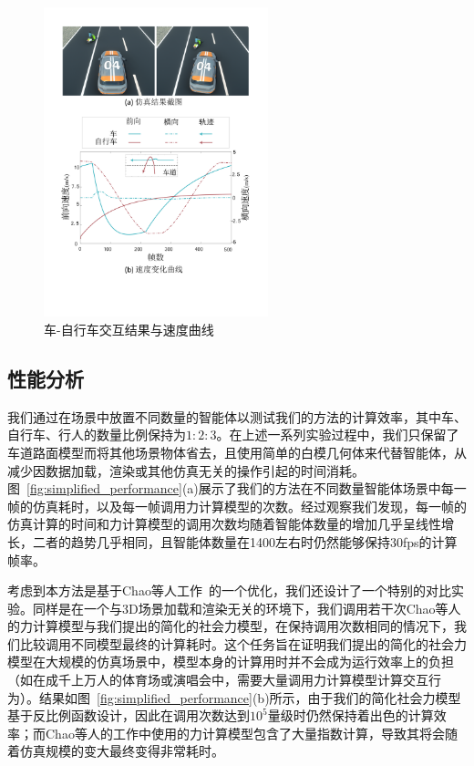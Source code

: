 \begin{figure}[!tbh]
\centering
\includegraphics[width=0.58\textwidth]{figure/simplified/simplified_case3_vert_cn v2.pdf}
\caption[车-自行车交互结果与速度曲线]{
车-自行车交互结果与速度曲线
}
\label{fig:simplified_case3}
\end{figure}


\subsection{性能分析}
\label{section:simplified_performance}

我们通过在场景中放置不同数量的智能体以测试我们的方法的计算效率，其中车、自行车、行人的数量比例保持为$1:2:3$。在上述一系列实验过程中，我们只保留了车道路面模型而将其他场景物体省去，且使用简单的白模几何体来代替智能体，从减少因数据加载，渲染或其他仿真无关的操作引起的时间消耗。图~\ref{fig:simplified_performance}(a)展示了我们的方法在不同数量智能体场景中每一帧的仿真耗时，以及每一帧调用力计算模型的次数。经过观察我们发现，每一帧的仿真计算的时间和力计算模型的调用次数均随着智能体数量的增加几乎呈线性增长，二者的趋势几乎相同，且智能体数量在1400左右时仍然能够保持30fps的计算帧率。

考虑到本方法是基于Chao等人工作~\cite{chao2019force}的一个优化，我们还设计了一个特别的对比实验。同样是在一个与3D场景加载和渲染无关的环境下，我们调用若干次Chao等人的力计算模型与我们提出的简化的社会力模型，在保持调用次数相同的情况下，我们比较调用不同模型最终的计算耗时。这个任务旨在证明我们提出的简化的社会力模型在大规模的仿真场景中，模型本身的计算用时并不会成为运行效率上的负担（如在成千上万人的体育场或演唱会中，需要大量调用力计算模型计算交互行为）。结果如图~\ref{fig:simplified_performance}(b)所示，由于我们的简化社会力模型基于反比例函数设计，因此在调用次数达到$10^5$量级时仍然保持着出色的计算效率；而Chao等人的工作中使用的力计算模型包含了大量指数计算，导致其将会随着仿真规模的变大最终变得非常耗时。


